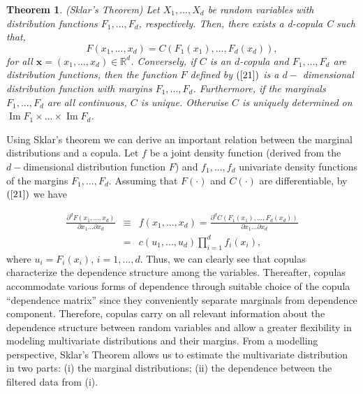 \documentclass[a4paper]{article}
\DeclareMathOperator{\Ima}{Im}
\newtheorem{theorem}{Theorem}
\begin{document}
	\vspace{0.6cm}
	
    \begin{theorem}
		(Sklar's Theorem) Let $X_{1},...,X_{d}$ be random variables with
		distribution functions $F_{1},...,F_{d}$, respectively. Then, there exists
		a d-copula C such that,
		\begin{equation}
		F\left( x_{1},...,x_{d}\right) =C\left( F_{1}\left( x_{1}\right)
		,...,F_{d}\left( x_{d}\right) \right) ,  \label{21}
		\end{equation}
	for all $\mathbf{x}=\left( x_{1},...,x_{d}\right) \in
	\mathbb{R}
	^{d}$. Conversely, if $C$ is an $d$-copula and $F_{1},...,F_{d}$ are
	distribution functions, then the function $F$ defined by $\left( \ref{21}\right) $ is a $d-$%
	dimensional distribution function with margins $F_{1},...,F_{d}$. Furthermore, if the marginals $F_{1},...,F_{d}$ are all continuous, $C$ is
	unique. Otherwise $C$ is uniquely determined on $\Ima F_{1}\times ...\times \Ima %
	F_{d}$.
\end{theorem}
	
	Using Sklar's theorem we can derive an important
	relation between the marginal distributions and a copula. Let $f$ be a
	joint density function (derived from the $d-$dimensional distribution function $F$)
	and $f_{1},...,f_{d}$ univariate density functions of the margins $%
	F_{1},...,F_{d}$. Assuming that $F\left( \cdot \right) $ and $C\left( \cdot
	\right) $ are differentiable, by $\left( \ref{21}\right)$ we have
	
	\begin{eqnarray}
	\frac{\partial ^{d}F\left( x_{1},...,x_{d}\right) }{\partial
		x_{1}...\partial x_{d}} &\equiv &f\left( x_{1},...,x_{d}\right) =\frac{
		\partial ^{d}C\left( F_{1}\left( x_{1}\right) ,...,F_{d}\left( x_{d}\right)
		\right) }{\partial x_{1}...\partial x_{d}} \\
	&=&c\left( u_{1},...,u_{d}\right) \prod_{i=1}^{d}f_{i}\left( x_{i}\right),
	\label{23}
	\end{eqnarray}%
	where $u_{i}=F_{i}\left( x_{i}\right) $, $i=1,...,d$. Thus, we can clearly see that copulas characterize the dependence structure among the variables. Thereafter, copulas accommodate various forms of dependence through suitable choice of the copula ``dependence matrix'' since they conveniently separate marginals from dependence component. Therefore, copulas carry on all relevant information about the dependence structure between random variables and allow a greater flexibility in modeling multivariate distributions and their margins. From a modelling perspective, Sklar’s Theorem allows us to estimate the multivariate distribution in two parts: (i) the marginal distributions; (ii) the dependence between the filtered data from (i).
	
\end{document}
